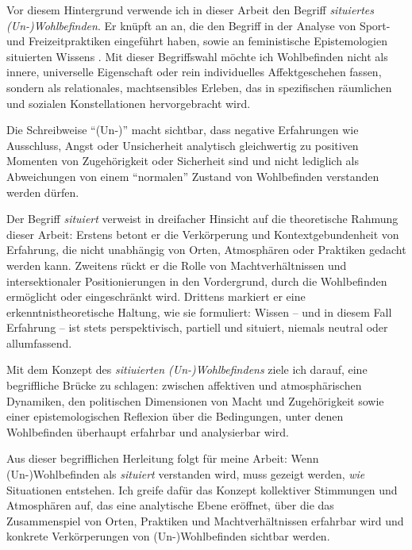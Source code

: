 Vor diesem Hintergrund verwende ich in dieser Arbeit den Begriff \emph{situiertes (Un-)Wohlbefinden}. Er knüpft an \textcite{leeUnderstandingDisruptedParticipation2021} an, die den Begriff in der Analyse von Sport- und Freizeitpraktiken eingeführt haben, sowie an feministische Epistemologien situierten Wissens \parencite{harawaySituatedKnowledgesScience1988}. Mit dieser Begriffswahl möchte ich Wohlbefinden nicht als innere, universelle Eigenschaft oder rein individuelles Affektgeschehen fassen, sondern als relationales, machtsensibles Erleben, das in spezifischen räumlichen und sozialen Konstellationen hervorgebracht wird. 

Die Schreibweise \enquote{(Un-)} macht sichtbar, dass negative Erfahrungen wie Ausschluss, Angst oder Unsicherheit analytisch gleichwertig zu positiven Momenten von Zugehörigkeit oder Sicherheit sind und nicht lediglich als Abweichungen von einem \enquote{normalen} Zustand von Wohlbefinden verstanden werden dürfen. 

Der Begriff \emph{situiert} verweist in dreifacher Hinsicht auf die theoretische Rahmung dieser Arbeit: Erstens betont er die Verkörperung und Kontextgebundenheit von Erfahrung, die nicht unabhängig von Orten, Atmosphären oder Praktiken gedacht werden kann. Zweitens rückt er die Rolle von Machtverhältnissen und intersektionaler Positionierungen in den Vordergrund, durch die Wohlbefinden ermöglicht oder eingeschränkt wird. Drittens markiert er eine erkenntnistheoretische Haltung, wie sie \textcite{harawaySituatedKnowledgesScience1988} formuliert: Wissen -- und in diesem Fall Erfahrung -- ist stets perspektivisch, partiell und situiert, niemals neutral oder allumfassend. 

Mit dem Konzept des \emph{sitiuierten (Un-)Wohlbefindens} ziele ich darauf, eine begriffliche Brücke zu schlagen: zwischen affektiven und atmosphärischen Dynamiken, den politischen Dimensionen von Macht und Zugehörigkeit sowie einer epistemologischen Reflexion über die Bedingungen, unter denen Wohlbefinden überhaupt erfahrbar und analysierbar wird.

\vspace{1em}

Aus dieser begrifflichen Herleitung folgt für meine Arbeit: Wenn (Un-)Wohlbefinden als \emph{situiert} verstanden wird, muss gezeigt werden, \emph{wie} Situationen entstehen. Ich greife dafür das Konzept kollektiver Stimmungen und Atmosphären auf, das eine analytische Ebene eröffnet, über die das Zusammenspiel von Orten, Praktiken und Machtverhältnissen erfahrbar wird und konkrete Verkörperungen von (Un-)Wohlbefinden sichtbar werden.

